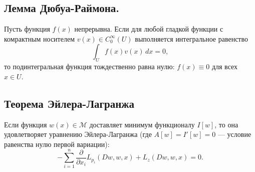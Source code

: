 \subsection{Лемма Дюбуа-Раймона.}
\begin{lemma}
    Пусть функция $f(x)$ непрерывна. 
    Если для любой гладкой функции с комрактным носителем
    $v(x) \in C_0^\infty(U)$ выполняется интегральное равенство
    \begin{equation}
        \int_U f(x) v(x) \, dx = 0,
    \end{equation}
    то подинтегральная функция тождественно равна нулю: 
    $f(x) \equiv 0$ для всех $x \in U$.
\end{lemma}

\subsection{Теорема Эйлера-Лагранжа}
\begin{theorem}
    Если функция $w(x) \in \mathcal{M}$ доставляет минимум функционалу $I[w]$,
    то она удовлетворяет уравнению Эйлера-Лагранжа 
    (где $A[w] = I'[w] = 0$ --- условие равенства нулю первой вариации):
    \begin{equation}
        - \sum_{i=1}^n \frac{\partial}{\partial x_i} L_{p_i} (Dw, w, x) + L_z(Dw, w, x) = 0.
    \end{equation}
\end{theorem}

